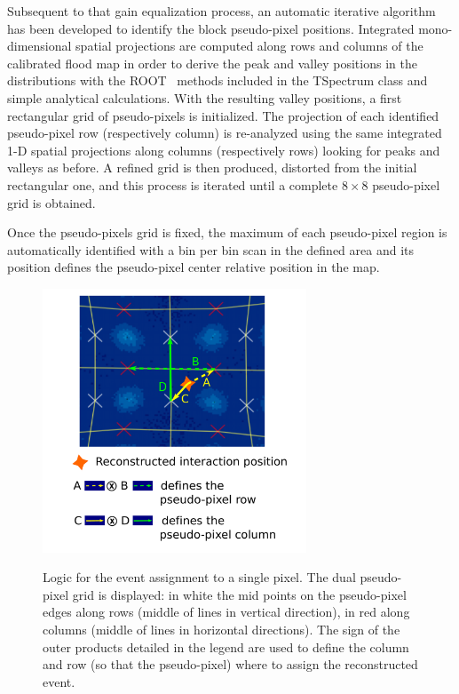 Subsequent to that gain equalization process, an automatic iterative algorithm has been developed to identify the block pseudo-pixel positions. Integrated mono-dimensional spatial projections are computed along rows and columns of the calibrated flood map in order to derive the peak and valley positions in the distributions with the ROOT~\parencite{Brun1997} methods included in the TSpectrum class and simple analytical calculations. With the resulting valley positions, a first rectangular grid of pseudo-pixels is initialized. The projection of each identified pseudo-pixel row (respectively column) is re-analyzed using the same integrated 1-D spatial projections along columns (respectively rows) looking for peaks and valleys as before. 
A refined grid is then produced, distorted from the initial rectangular one, and this process is iterated until a complete $8\times8$ pseudo-pixel grid is obtained. 

Once the pseudo-pixels grid is fixed, the maximum of each pseudo-pixel region is automatically identified with a bin per bin scan in the defined area and its position defines the pseudo-pixel center relative position in the map. 

\begin{figure} [!h]
\centering
{\includegraphics[width=0.7\textwidth]{03_GraphicFiles/chapter3_CLaRySproto/Absorber/images_charResults_Co60/vector_def_2.pdf}}
\caption{Logic for the event assignment to a single pixel. The dual pseudo-pixel grid is displayed: in white the mid points on the pseudo-pixel edges along rows (middle of lines in vertical direction), in red along columns (middle of lines in horizontal directions). The sign of the outer products detailed in the legend are used to define the column and row (so that the pseudo-pixel) where to assign the reconstructed event.}
\label{chap3::fig::vectors}
\end{figure}

